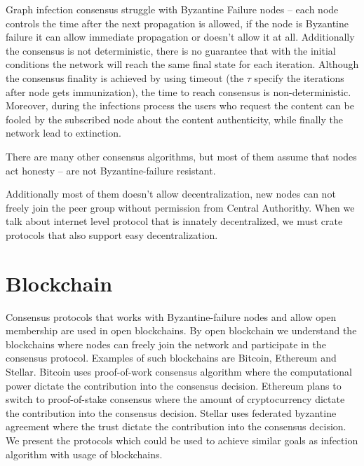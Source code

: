 \documentclass[nostrict]{szablonPG}
\begin{document}
Graph infection consensus struggle with Byzantine Failure nodes -- each node controls the time after the next propagation is allowed, if the node is Byzantine failure it can allow immediate propagation or doesn't allow it at all. Additionally the consensus is not deterministic, there is no guarantee that with the initial conditions the network will reach the same final state for each iteration. Although the consensus finality is achieved by using timeout (the $\tau$ specify the iterations after node gets immunization), the time to reach consensus is non-deterministic. Moreover, during the infections process the users who request the content can be fooled by the subscribed node about the content authenticity, while finally the network lead to extinction.

There are many other consensus algorithms, but most of them assume that nodes act honesty -- are not Byzantine-failure resistant. 

Additionally most of them doesn't allow decentralization, new nodes can not freely join the peer group without permission from Central Authorithy. When we talk about internet level protocol that is innately decentralized, we must crate protocols that also support easy decentralization.

\section{Blockchain}
Consensus protocols that works with Byzantine-failure nodes and allow open membership are used in open blockchains. By open blockchain we understand the blockchains where nodes can freely join the network and participate in the consensus protocol. Examples of such blockchains are Bitcoin, Ethereum and Stellar. Bitcoin uses proof-of-work consensus algorithm where the computational power dictate the contribution into the consensus decision. Ethereum plans to switch to proof-of-stake consensus where the amount of cryptocurrency dictate the contribution into the consensus decision. Stellar uses federated byzantine agreement where the trust dictate the contribution into the consensus decision. 
We present the protocols which could be used to achieve similar goals as infection algorithm with usage of blockchains.
\end{document}
